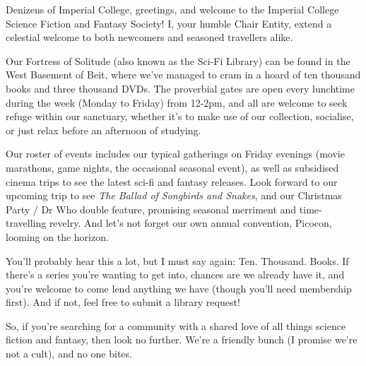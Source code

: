 Denizens of Imperial College, greetings, and welcome to the Imperial College Science Fiction and Fantasy Society! I, your humble Chair Entity, extend a celestial welcome to both newcomers and seasoned travellers alike.

Our Fortress of Solitude (also known as the Sci-Fi Library) can be found in the West Basement of Beit, where we've managed to cram in a hoard of ten thousand books and three thousand DVDs. The proverbial gates are open every lunchtime during the week (Monday to Friday) from 12-2pm, and all are welcome to seek refuge within our sanctuary, whether it's to make use of our collection, socialise, or just relax before an afternoon of studying.

Our roster of events includes our typical gatherings on Friday evenings (movie marathons, game nights, the occasional seasonal event), as well as subsidised cinema trips to see the latest sci-fi and fantasy releases. Look forward to our upcoming trip to see \textit{The Ballad of Songbirds and Snakes}, and our Christmas Party / Dr Who double feature, promising seasonal merriment and time-travelling revelry. And let's not forget our own annual convention, Picocon, looming on the horizon.

You'll probably hear this a lot, but I must say again: Ten. Thousand. Books. If there’s a series you're wanting to get into, chances are we already have it, and you’re welcome to come lend anything we have (though you’ll need membership first). And if not, feel free to submit a library request!

So, if you're searching for a community with a shared love of all things science fiction and fantasy, then look no further. We're a friendly bunch (I promise we're not a cult), and no one bites\footnotemark[2]{}.
